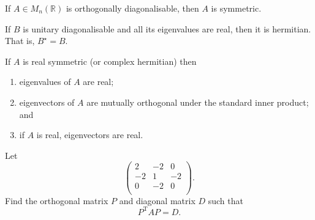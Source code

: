 \begin{proposition}
    If $A \in M_n(\mathbb R)$ is orthogonally diagonalisable, then $A$ is symmetric.
\end{proposition}

\begin{proposition}
    If $B$ is unitary diagonalisable and all its eigenvalues are real, then it is hermitian. That is, $B^{\star} = B$.
\end{proposition}

\begin{proposition}
    If $A$ is real symmetric (or complex hermitian) then
    \begin{enumerate}
        \item eigenvalues of $A$ are real;
        \item eigenvectors of $A$ are mutually orthogonal under the standard inner product; and
        \item if $A$ is real, eigenvectors are real.
    \end{enumerate}
\end{proposition}

\begin{example}
    Let 
    \[
        \begin{pmatrix}
            2 & -2 & 0 \\
            -2 & 1 & -2 \\
            0 & -2 & 0 \\
        \end{pmatrix}
        .
    \]
    Find the orthogonal matrix $P$ and diagonal matrix $D$ such that \[ P^{\mathrm T} A P = D. \]
\end{example}

